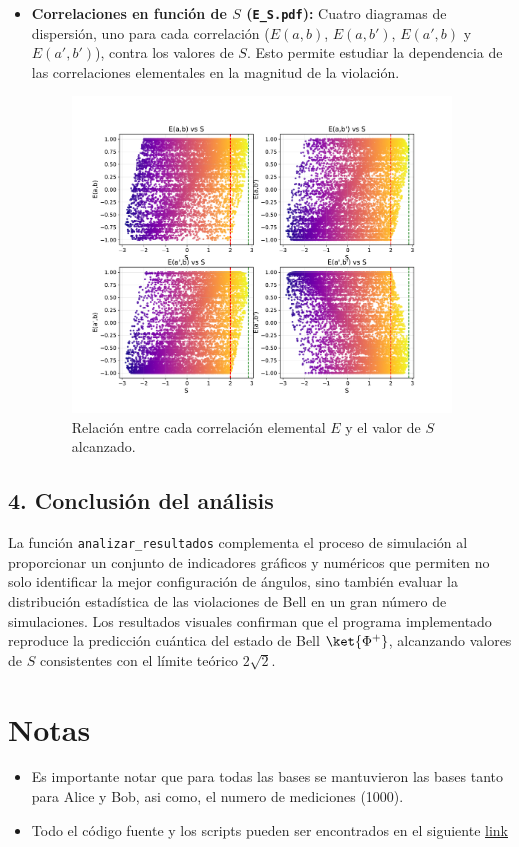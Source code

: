 \documentclass[11pt]{article}
\begin{document}
\begin{itemize}
    \item \textbf{Correlaciones en función de $S$ (\texttt{E\_S.pdf}):}  
    Cuatro diagramas de dispersión, uno para cada correlación ($E(a,b)$, $E(a,b')$, $E(a',b)$ y $E(a',b')$), contra los valores de $S$. Esto permite estudiar la dependencia de las correlaciones elementales en la magnitud de la violación.
    
    \begin{figure}[H]
        \centering
        \includegraphics[width=0.95\textwidth]{Figures/E_S.pdf}
        \caption{Relación entre cada correlación elemental $E$ y el valor de $S$ alcanzado.}
    \end{figure}
\end{itemize}


\subsection*{4. Conclusión del análisis}
La función \texttt{analizar\_resultados} complementa el proceso de simulación al proporcionar un conjunto de indicadores gráficos y numéricos que permiten no solo identificar la mejor configuración de ángulos, sino también evaluar la distribución estadística de las violaciones de Bell en un gran número de simulaciones. Los resultados visuales confirman que el programa implementado reproduce la predicción cuántica del estado de Bell $\ket{\Phi^+}$, alcanzando valores de $S$ consistentes con el límite teórico $2\sqrt{2}$.





\section{Notas}

\begin{itemize}
    \item Es importante notar que para todas las bases se mantuvieron las bases tanto para Alice y Bob, asi como, el numero de mediciones (1000).
    \item Todo el código fuente y los scripts pueden ser encontrados en el siguiente \href{https://github.com/LukasWolff2002/TAREA_4_QM}{link}
\end{itemize}
\end{document}

